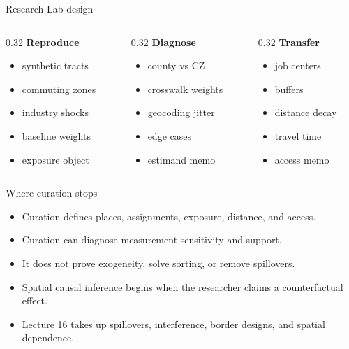 \documentclass[aspectratio=169,11pt]{beamer}
\newcommand{\1}{\mathbf{1}}
\begin{document}
\begin{frame}{Research Lab design}
\begin{columns}[T,onlytextwidth]
\begin{column}{0.32\linewidth}
\textbf{Reproduce}
\begin{itemize}
    \item synthetic tracts
    \item commuting zones
    \item industry shocks
    \item baseline weights
    \item exposure object
\end{itemize}
\end{column}
\begin{column}{0.32\linewidth}
\textbf{Diagnose}
\begin{itemize}
    \item county vs CZ
    \item crosswalk weights
    \item geocoding jitter
    \item edge cases
    \item estimand memo
\end{itemize}
\end{column}
\begin{column}{0.32\linewidth}
\textbf{Transfer}
\begin{itemize}
    \item job centers
    \item buffers
    \item distance decay
    \item travel time
    \item access memo
\end{itemize}
\end{column}
\end{columns}
\end{frame}

\begin{frame}{Where curation stops}
\begin{itemize}
    \item Curation defines places, assignments, exposure, distance, and access.
    \item Curation can diagnose measurement sensitivity and support.
    \item It does not prove exogeneity, solve sorting, or remove spillovers.
    \item Spatial causal inference begins when the researcher claims a counterfactual effect.
    \item Lecture 16 takes up spillovers, interference, border designs, and spatial dependence.
\end{itemize}
\end{frame}
\end{document}
